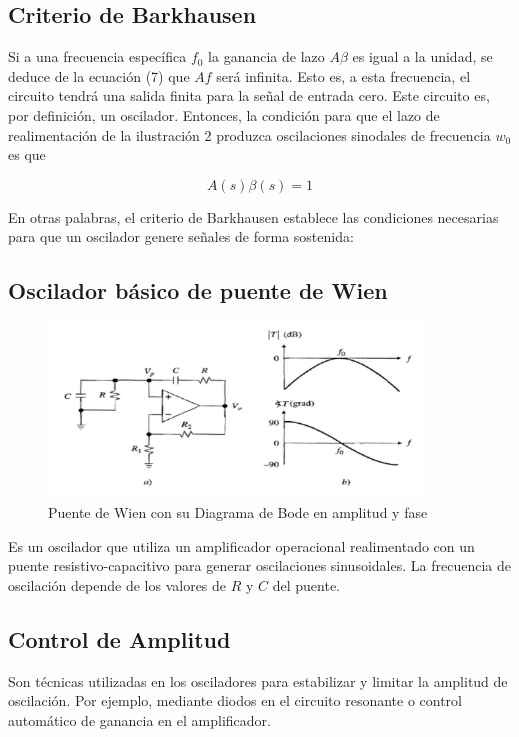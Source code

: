     \subsection{Criterio de Barkhausen}

        Si a una frecuencia específica \(f_0\) la ganancia de lazo \(A\beta\) es igual a la unidad, se deduce de la ecuación (7) que \(Af\) será infinita. Esto es, a esta frecuencia, el circuito tendrá una salida finita para la señal de entrada cero. Este circuito es, por definición, un oscilador. Entonces, la condición para que el lazo de realimentación de la ilustración 2 produzca oscilaciones sinodales de frecuencia \(w_0\) es que
        
        \begin{equation}
            A(s)\beta(s) = 1
        \end{equation}

        En otras palabras, el criterio de Barkhausen establece las condiciones necesarias para que un oscilador genere señales de forma sostenida:

    \subsection{Oscilador básico de puente de Wien}
    

        \begin{figure}[H]
            \centering
            \includegraphics[width=10cm]{Imagenes/3.png}
            \caption{Puente de Wien con su Diagrama de Bode en amplitud y fase}
            \label{fig:3}
        \end{figure}
        
        Es un oscilador que utiliza un amplificador operacional realimentado con un puente resistivo-capacitivo para generar oscilaciones sinusoidales. La frecuencia de oscilación depende de los valores de \(R\) y \(C\) del puente.

    \subsection{Control de Amplitud}
        Son técnicas utilizadas en los osciladores para estabilizar y limitar la amplitud de oscilación. Por ejemplo, mediante diodos en el circuito resonante o control automático de ganancia en el amplificador.

